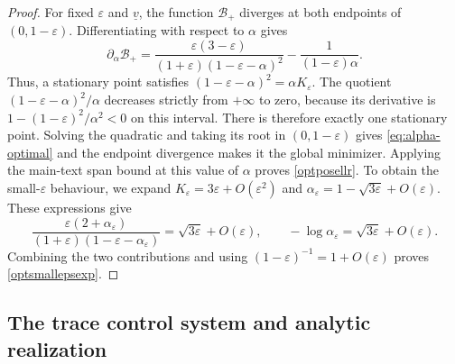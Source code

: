 \documentclass[amsmath,amsfonts,amssymb,aps,pra,superscriptaddress,10pt]{revtex4-2}
\numberwithin{equation}{section}
\theoremstyle{plain}
\theoremstyle{definition}
\theoremstyle{remark}
\theoremstyle{definition}
\begin{document}
\begin{proof}
For fixed $\varepsilon$ and $\underline{v}$, the function $\mathcal{B}_+$ diverges at both endpoints of $(0,1-\varepsilon)$. Differentiating with respect to $\alpha$ gives
\begin{equation}
\partial_\alpha\mathcal{B}_+=\frac{\varepsilon(3-\varepsilon)}
{(1+\varepsilon)(1-\varepsilon-\alpha)^2}-\frac{1}{(1-\varepsilon)\alpha}.
\end{equation}
Thus, a stationary point satisfies $(1-\varepsilon-\alpha)^2=\alpha K_\varepsilon$. The quotient $(1-\varepsilon-\alpha)^2/\alpha$ decreases strictly from $+\infty$ to zero, because its derivative is $1-(1-\varepsilon)^2/\alpha^2<0$ on this interval. There is therefore exactly one stationary point. Solving the quadratic and taking its root in $(0,1-\varepsilon)$ gives \eqref{eq:alpha-optimal} and the endpoint divergence makes it the global minimizer. Applying the main-text span bound at this value of $\alpha$ proves \eqref{optposellr}. To obtain the small-$\varepsilon$ behaviour, we expand $K_\varepsilon=3\varepsilon+O(\varepsilon^2)$ and $\alpha_\varepsilon=1-\sqrt{3\varepsilon}+O(\varepsilon)$. These expressions give
\begin{equation}
\frac{\varepsilon(2+\alpha_\varepsilon)}{(1+\varepsilon)(1-\varepsilon-\alpha_\varepsilon)}=\sqrt{3\varepsilon}+O(\varepsilon),\qquad
-\log\alpha_\varepsilon=\sqrt{3\varepsilon}+O(\varepsilon).
\end{equation}
Combining the two contributions and using $(1-\varepsilon)^{-1}=1+O(\varepsilon)$ proves \eqref{optsmallepsexp}.
\end{proof}

\subsection{The trace control system and analytic realization}
\end{document}
